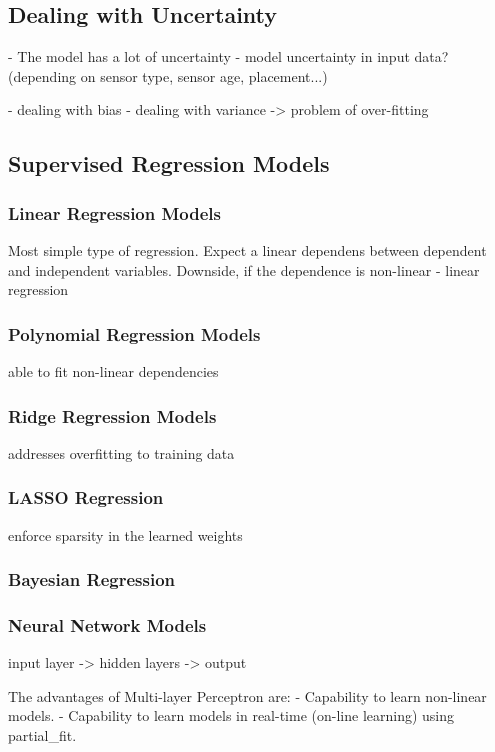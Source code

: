 \subsection{Dealing with Uncertainty}
- The model has a lot of uncertainty
- model uncertainty in input data? (depending on sensor type, sensor age, placement...)

- dealing with bias
- dealing with variance
-> problem of over-fitting

\subsection{Supervised Regression Models}

\subsubsection{Linear Regression Models}
Most simple type of regression. Expect a linear dependens between dependent and independent variables. Downside, if the dependence is non-linear
- linear regression

\subsubsection{Polynomial Regression Models}
able to fit non-linear dependencies

\subsubsection{Ridge Regression Models}
addresses overfitting to training data

\subsubsection{LASSO Regression}
enforce sparsity in the learned weights

\subsubsection{Bayesian Regression}

\subsubsection{Neural Network Models}
input layer -> hidden layers -> output

The advantages of Multi-layer Perceptron are:
- Capability to learn non-linear models.
- Capability to learn models in real-time (on-line learning) using partial\_fit.

